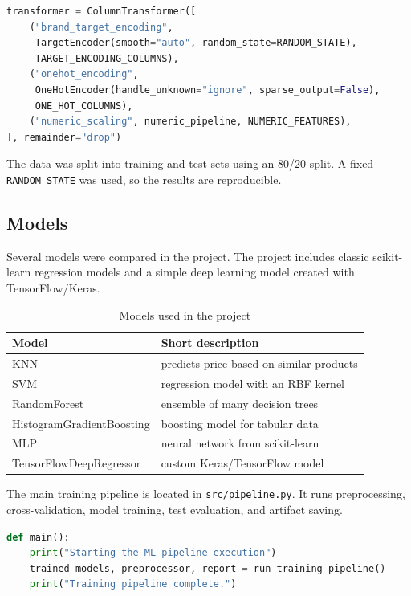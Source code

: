 \documentclass[12pt,a4paper]{article}
\begin{document}
\begin{lstlisting}[language=Python, caption={Part of the preprocessing pipeline}]
transformer = ColumnTransformer([
    ("brand_target_encoding",
     TargetEncoder(smooth="auto", random_state=RANDOM_STATE),
     TARGET_ENCODING_COLUMNS),
    ("onehot_encoding",
     OneHotEncoder(handle_unknown="ignore", sparse_output=False),
     ONE_HOT_COLUMNS),
    ("numeric_scaling", numeric_pipeline, NUMERIC_FEATURES),
], remainder="drop")
\end{lstlisting}

The data was split into training and test sets using an 80/20 split. A fixed \texttt{RANDOM\_STATE} was used, so the results are reproducible.

\subsection{Models}

Several models were compared in the project. The project includes classic scikit-learn regression models and a simple deep learning model created with TensorFlow/Keras.

\begin{table}[H]
\centering
\begin{tabular}{|p{5cm}|p{8cm}|}
\hline
\textbf{Model} & \textbf{Short description} \\ \hline
KNN & predicts price based on similar products \\ \hline
SVM & regression model with an RBF kernel \\ \hline
RandomForest & ensemble of many decision trees \\ \hline
HistogramGradientBoosting & boosting model for tabular data \\ \hline
MLP & neural network from scikit-learn \\ \hline
TensorFlowDeepRegressor & custom Keras/TensorFlow model \\ \hline
\end{tabular}
\caption{Models used in the project}
\label{tab:models}
\end{table}

The main training pipeline is located in \texttt{src/pipeline.py}. It runs preprocessing, cross-validation, model training, test evaluation, and artifact saving.

\begin{lstlisting}[language=Python, caption={Running the full training pipeline}]
def main():
    print("Starting the ML pipeline execution")
    trained_models, preprocessor, report = run_training_pipeline()
    print("Training pipeline complete.")
\end{lstlisting}
\end{document}
